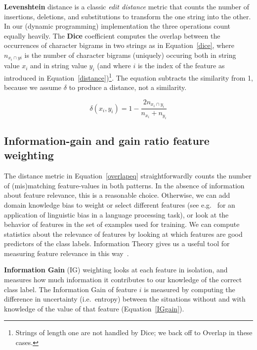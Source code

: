 \documentclass{book}
\begin{document}
{\bf Levenshtein} distance is a classic {\em edit distance}\/ metric
\cite{Levenshtein66} that counts the number of insertions, deletions,
and substitutions to transform the one string into the other. In our
(dynamic programming) implementation the three operations count
equally heavily. The {\bf Dice} coefficient computes the overlap
between the occurrences of character bigrams in two strings as in
Equation~\ref{dice}, where $n_{x_{i} \cap y{i}}$ is the number of
character bigrams (uniquely) occuring both in string value $x_{i}$ and
in string value $y_{i}$ (and where $i$ is the index of the feature as
introduced in Equation~\ref{distance})\footnote{Strings of length one
  are not handled by Dice; we back off to Overlap in these
  cases.}. The equation subtracts the similarity from 1, because we
assume $\delta$ to produce a distance, not a similarity.

\begin{equation}
\delta(x_{i}, y_{i}) = 1 - \frac{2 n_{x_{i} \cap y_{i}}}{n_{x_{i}} + n_{y_{i}}}
\label{dice}
\end{equation}

\subsection{Information-gain and gain ratio feature weighting}
\label{infogain}

The distance metric in Equation~\ref{overlapeq} straightforwardly counts the
number of (mis)matching feature-values in both patterns. In the
absence of information about feature relevance, this is a reasonable
choice. Otherwise, we can add domain knowledge bias to weight or
select different features (see e.g.~ for an
application of linguistic bias in a language processing task), or look
at the behavior of features in the set of examples used for
training. We can compute statistics about the relevance of features by
looking at which features are good predictors of the class
labels. Information Theory gives us a useful tool for measuring
feature relevance in this way~\cite{Quinlan86,Quinlan93}.

{\bf Information Gain} (IG) weighting looks at each feature in
isolation, and measures how much information it contributes to our
knowledge of the correct class label. The Information Gain of feature
$i$ is measured by computing the difference in uncertainty
(i.e.\ entropy) between the situations without and with knowledge of
the value of that feature (Equation~\ref{IGgain}).
\end{document}
